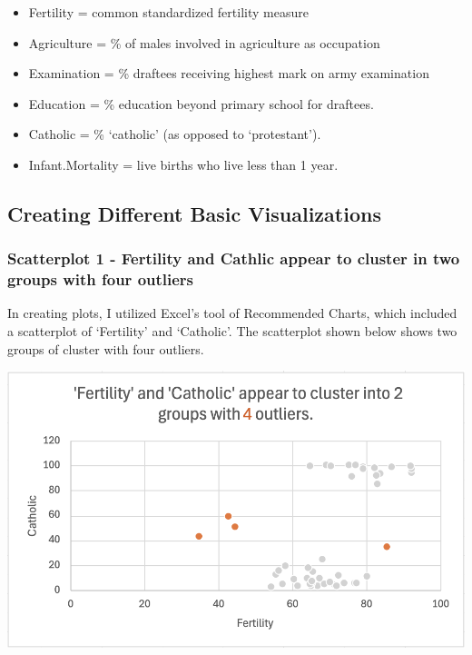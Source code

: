 \documentclass[
  letterpaper,
  DIV=11,
  numbers=noendperiod]{scrreprt}
\providecommand{\tightlist}{%
  \setlength{\itemsep}{0pt}\setlength{\parskip}{0pt}}\usepackage{longtable,booktabs,array}
\begin{document}
\begin{itemize}
\tightlist
\item
  Fertility = common standardized fertility measure
\item
  Agriculture = \% of males involved in agriculture as occupation
\item
  Examination = \% draftees receiving highest mark on army examination
\item
  Education = \% education beyond primary school for draftees.
\item
  Catholic = \% `catholic' (as opposed to `protestant').
\item
  Infant.Mortality = live births who live less than 1 year.
\end{itemize}

\subsection{Creating Different Basic
Visualizations}\label{creating-different-basic-visualizations}

\subsubsection{Scatterplot 1 - Fertility and Cathlic appear to cluster
in two groups with four
outliers}\label{scatterplot-1---fertility-and-cathlic-appear-to-cluster-in-two-groups-with-four-outliers}

In creating plots, I utilized Excel's tool of Recommended Charts, which
included a scatterplot of `Fertility' and `Catholic'. The scatterplot
shown below shows two groups of cluster with four outliers.

\includegraphics{./Excel_1_Unit/Week1_Janice/Week 1/Week 1 Wednesday/Swiss_scatterplot.png}
\end{document}
